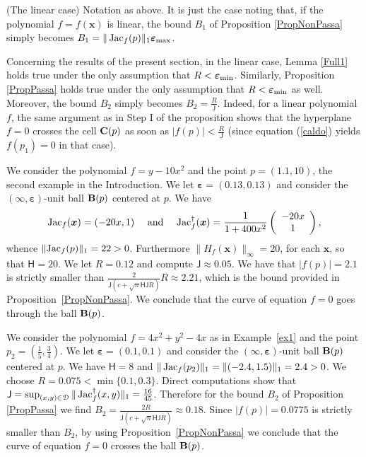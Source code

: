 \documentclass[10pt]{article}
\newcommand{\x}{{\bm x}}
\newcommand{\epsbold}{{\bm \varepsilon}}
\def\Jac{\mathop{\rm Jac}\nolimits}
\newtheorem{re}[theorem]{Remark}
\newtheorem{examp}[theorem]{Example}
\newenvironment{rem*}{\begin{re}\em}{\end{re}}
\newenvironment{example*}{\begin{examp}\em}{\end{examp}}
\begin{document}
\begin{rem*}\label{lineare} (The linear case) Notation as above. It is just the case noting that, if  the polynomial $f=f(\x)$ is  linear, the bound $B_1$ of Proposition \ref{PropNonPassa} simply becomes $B_1= \|\Jac_f(p)\|_1 \epsbold_{\rm max}$. 

Concerning the results of the present section, in the  linear case, Lemma 
 \ref{Full1} holds true under the only assumption that $R<\epsbold_{{\rm min}}$.
Similarly,  Proposition \ref{PropPassa} holds true  under the only assumption that $R< \epsbold_{{\rm min}}$  as well. Moreover,  the bound $B_2$ simply becomes $B_2=\frac{R}{\mathsf J}$.  Indeed, for a linear polynomial $f$,  the same argument as in Step I of the proposition shows that the hyperplane $f=0$ crosses the cell ${\bf C}(p)$ as soon as $|f(p)|<\frac{R}{\mathsf J}$ (since equation (\ref{caldo}) yields $f(p_1)=0$ in that case).
 \end{rem*}
 
 
\begin{example*}
We consider the polynomial $f=y -10x^2$ 
and the point $p=(1.1,10)$, the second  example in the Introduction.  
We let $\epsbold =(0.13,0.13)$ and consider the
$(\infty,\epsbold)$-unit ball ${\bf B}(p)$ centered at $p$.
We have
\begin{eqnarray*}
{\rm Jac}_f(\bm x)= (-20x, 1 )\quad \textrm{ and } \quad 
{\rm Jac}_f^\dagger(\bm x)= \frac{1}{1+400x^2}
\left ( \begin{array}{c}
-20x\\ 1  \end{array}\right ),
\end{eqnarray*}
whence  $\|{\rm Jac}_f(p)\|_1 =22 >0$. Furthermore $\|H_f(\bm x)\|_\infty = 20$, 
for each $\bm x$, so that ${\mathsf H}=20$.
We let $R =0.12$ and compute $\mathsf J \approx 0.05$.  
We have that $|f(p)|=2.1$ is strictly smaller than  
$\frac{2}{\mathsf J(c+ \sqrt{n}{\mathsf H} {\mathsf J} R)} R \approx 2.21$,
which is the bound provided in Proposition~\ref{PropNonPassa}. 
We conclude that the curve of equation $f=0$ goes through the ball ${\bf B}(p)$.
\end{example*}


\begin{example*}
We consider the polynomial $f =4x^2+y^2-4x$ as in Example~\ref{ex1} and the point 
$p_2=(\frac{1}{5}, \frac{3}{4})$.
We let $\epsbold =(0.1,0.1)$ and consider the
$(\infty,\epsbold)$-unit ball   ${\bf B}(p)$ centered at $p$.
We have ${\mathsf H}=8$  and 
$\|\Jac_f(p_2)\|_1=\|(-2.4, 1.5)\|_1 = 2.4 >0$. We choose $R=0.075 < \min \{0.1, 0.3\}$.
Direct computations  show that 
$\mathsf J =\sup_{(x,y) \in \mathcal D} \|\Jac_f^\dagger(x,y)\|_1 = \frac{16}{45}$.
Therefore for the bound $B_2$ of Proposition \ref{PropPassa}  we find  
 $ B_2 = \frac{2R}{\mathsf J(c+ \sqrt{n}{\mathsf H} {\mathsf J} R)} \approx 0.18$.
Since $|f(p)|=0.0775$ is strictly smaller than $B_2$, 
by using Proposition~\ref{PropNonPassa} we conclude that the 
curve of equation $f=0$ crosses the  ball ${\bf B}(p)$. 
\end{example*}
\end{document}
